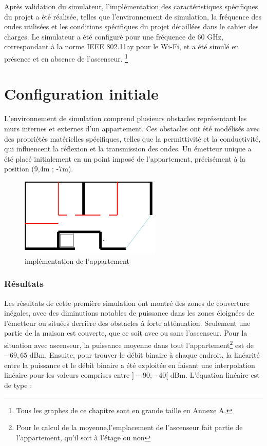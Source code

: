 Après validation du simulateur, l'implémentation des caractéristiques spécifiques du projet a été réalisée, telles que l'environnement de simulation, la fréquence des ondes utilisées et les conditions spécifiques du projet détaillées dans le cahier des charges. Le simulateur a été configuré pour une fréquence de 60 GHz, correspondant à la norme IEEE 802.11ay pour le Wi-Fi, et a été simulé en présence et en absence de l'ascenseur. \footnote{Tous les graphes de ce chapitre sont en grande taille en Annexe A.}


\section{Configuration initiale}
L'environnement de simulation comprend plusieurs obstacles représentant les murs internes et externes d'un appartement. Ces obstacles ont été modélisés avec des propriétés matérielles spécifiques, telles que la permittivité et la conductivité, qui influencent la réflexion et la transmission des ondes. Un émetteur unique a été placé initialement en un point imposé de l'appartement, précisément à la position (9,4m ; -7m).
\begin{figure}[H]
    \centering
    \includegraphics[width=0.6\textwidth]{Pictures/plan appart.jpeg}
    \caption{implémentation de l'appartement}
    \label{appart}
\end{figure}

\subsubsection{Résultats}
Les résultats de cette première simulation ont montré des zones de couverture inégales, avec des diminutions notables de puissance dans les zones éloignées de l'émetteur ou situées derrière des obstacles à forte atténuation. Seulement une partie de la maison est couverte, que ce soit avec ou sans l'ascenseur. Pour la situation avec ascenseur, la puissance moyenne dans tout l'appartement\footnote{Pour le calcul de la moyenne,l'emplacement de l'ascenseur fait partie de l'appartement, qu'il soit à l'étage ou non} est de $-69,65$ dBm. Ensuite, pour trouver le débit binaire à chaque endroit, la linéarité entre la puissance et le débit binaire a été exploitée en faisant une interpolation linéaire pour les valeurs comprises entre $]-90;-40[$ dBm. L'équation linéaire est de type :


